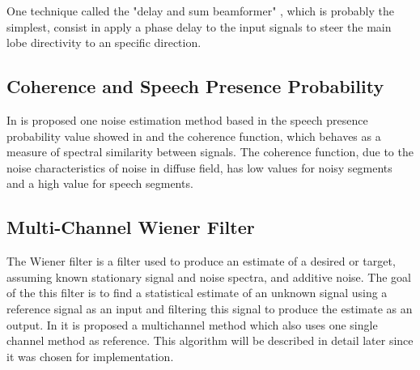 One technique called the "delay and sum beamformer" , which is probably the simplest, consist in apply a phase delay to the input signals to steer the main lobe directivity to an specific direction. 

\subsection{Coherence and Speech Presence Probability}

In \cite{Nelke2013DualProbability} is proposed one noise estimation method based in the speech presence probability value showed in \cite{Gerkmann2011NoisePresence} and the coherence function, which behaves as a measure of spectral similarity between signals. The coherence function, due to the noise characteristics of noise in diffuse field, has low values for noisy segments and a high value for speech segments.

\subsection{Multi-Channel Wiener Filter}

The Wiener filter is a filter used to produce an estimate of a desired or target, assuming known stationary signal and noise spectra, and additive noise. The goal of the this filter is to find a statistical estimate of an unknown signal using a reference signal as an input and filtering this signal to produce the estimate as an output. 
In \cite{Yong2013} it is proposed a multichannel method which also uses one single channel method as reference. This algorithm will be described in detail later since it was chosen for implementation.


